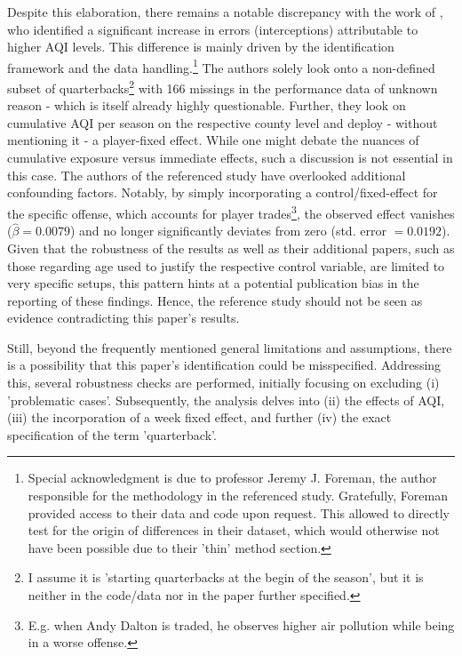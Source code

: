 \documentclass[12pt,a4paper]{article}
\begin{document}
{Despite this elaboration, there remains a notable discrepancy with the work of \citet{heintz2022}, who identified a significant increase in errors (interceptions) attributable to higher AQI levels. This difference is mainly driven by the identification framework and the data handling.\footnote{Special acknowledgment is due to professor Jeremy J. Foreman, the author responsible for the methodology in the referenced study. Gratefully, Foreman provided access to their data and code upon request. This allowed to directly test for the origin of differences in their dataset, which would otherwise not have been possible due to their 'thin' method section.} The authors solely look onto a non-defined subset of quarterbacks\footnote{I assume it is 'starting quarterbacks at the begin of the season', but it is neither in the code/data nor in the paper further specified.} with 166 missings in the performance data of unknown reason - which is itself already highly questionable. Further, they look on cumulative AQI per season on the respective county level and deploy - without mentioning it - a player-fixed effect.  While one might debate the nuances of cumulative exposure versus immediate effects, such a discussion is not essential in this case. The authors of the referenced study have overlooked additional confounding factors. Notably, by simply incorporating a control/fixed-effect for the specific offense, which accounts for player trades\footnote{E.g. when Andy Dalton is traded, he observes higher air pollution while being in a worse offense.}, the observed effect vanishes ($\hat{\beta} = 0.0079$) and no longer significantly deviates from zero (std. error $= 0.0192$). Given that the robustness of the results as well as their additional papers, such as those regarding age used to justify the respective control variable, are limited to very specific setups, this pattern hints at a potential publication bias in the reporting of these findings. Hence, the reference study should not be seen as evidence contradicting this paper's results. 

Still, beyond the frequently mentioned general limitations and assumptions, there is a possibility that this paper's identification could be misspecified. Addressing this, several robustness checks are performed, initially focusing on excluding (i) 'problematic cases'. Subsequently, the analysis delves into (ii) the effects of AQI, (iii) the incorporation of a week fixed effect, and further (iv) the exact specification of the term 'quarterback'. 

}
\end{document}
